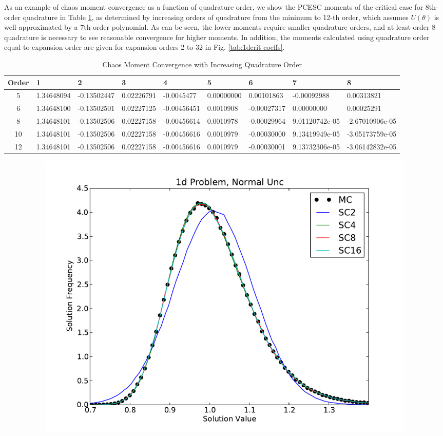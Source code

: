 As an example of chaos moment convergence as a function of quadrature order, we show the PCESC moments of the critical case for 8th-order quadrature in Table \ref{tab:quadconverge}, as determined by increasing orders of quadrature from the minimum to 12-th order, which assumes $U(\theta)$ is well-approximated by a 7th-order polynomial.  As can be seen, the lower moments require smaller quadrature orders, and at least order 8 quadrature is necessary to see reasonable convergence for higher moments.  In addition, the moments calculated using quadrature order equal to expansion order are given for expansion orders 2 to 32 in Fig. \ref{tab:1dcrit coeffs}.
\begin{landscape}
\begin{table}[H]
\begin{center}
\begin{tabular}{c | *{8}{l}}
Order & 1 & 2 & 3 & 4 & 5 & 6 & 7 & 8 \\ \hline
5 & 1.34648094 & -0.13502447 & 0.02226791 & -0.0045477 & 0.00000000 & 0.00101863 & -0.00092988 & 0.00313821\\
6 & 1.34648100 & -0.13502501 & 0.02227125 & -0.00456451 & 0.0010908 & -0.00027317 &  0.00000000 & 0.00025291\\ 
8 & 1.34648101 & -0.13502506 & 0.02227158 & -0.00456614 & 0.0010978 & -0.00029964 & 9.01120742e-05 & -2.67010906e-05\\ 
10& 1.34648101 & -0.13502506 & 0.02227158 & -0.00456616 & 0.0010979 & -0.00030000 & 9.13419949e-05 & -3.05173759e-05\\ 
12& 1.34648101 & -0.13502506 & 0.02227158 & -0.00456616 & 0.0010979 & -0.00030001 & 9.13732306e-05 & -3.06142832e-05
\end{tabular}
\end{center}
\caption{Chaos Moment Convergence with Increasing Quadrature Order}
\label{tab:quadconverge}
\end{table}
\vspace{50pt}
\begin{figure}[H]
\centering
\begin{subfigure}[b]{0.43\textwidth}
   \includegraphics[width=\textwidth]{../graphics/1d_normal_pdfs}

\end{subfigure}
\end{figure}
\end{landscape}
